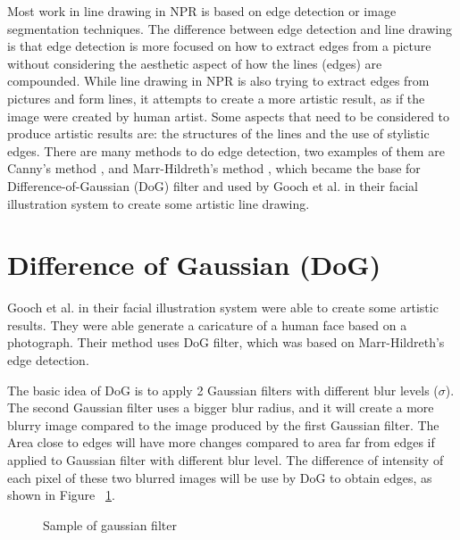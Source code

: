 Most work in line drawing in NPR is based on edge detection or image segmentation techniques. The difference between edge detection and line drawing is that edge detection is more focused on how to extract edges from a picture without considering the aesthetic aspect of how the lines (edges) are compounded. While line drawing in NPR is also trying to extract edges from pictures and form lines, it attempts to create a more artistic result, as if the image were created by human artist. Some aspects that need to be considered to produce artistic results are: the structures of the lines and the use of stylistic edges. There are many methods to do edge detection, two examples of them are Canny's method \cite{canny86}, and Marr-Hildreth's method \cite{marr-hildreth80}, which became the base for Difference-of-Gaussian (DoG) filter and used by Gooch et al. in their facial illustration system to create some artistic line drawing.

\section{Difference of Gaussian (DoG)} 
Gooch et al. in their facial illustration system \cite{gooch04} were able to create some artistic results. They were able generate a caricature of a human face based on a photograph. Their method uses DoG filter, which was based on Marr-Hildreth's edge detection.

The basic idea of DoG is to apply 2 Gaussian filters with different blur levels ($\sigma$). The second Gaussian filter uses a bigger blur radius, and it will create a more blurry image compared to the image produced by the first Gaussian filter. The Area close to edges will have more changes compared to area far from edges if applied to Gaussian filter with different blur level. The difference of intensity of each pixel of these two blurred images will be use by DoG to obtain edges, as shown in Figure ~\ref{fig:DoG_sample1}.

\begin{figure}[H]
\centering
\caption{Sample of gaussian filter}
\label{fig:DoG_sample1}
\end{figure}

